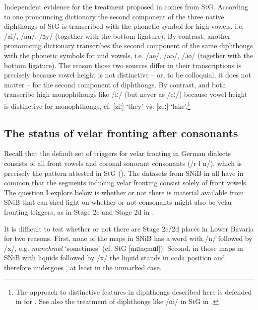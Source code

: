 Independent evidence for the treatment proposed in  comes from StG. According to one pronouncing dictionary \citep{Mangold2005} the second component of the three native diphthongs of StG is transcribed with the phonetic symbol for high vowels, i.e. /ai/, /au/, /ɔy/ (together with the bottom ligature). By contrast, another pronouncing dictionary \citep{Krech1982} transcribes the second component of the same diphthongs with the phonetic symbols for mid vowels, i.e. /ae/, /ao/, /ɔø/ (together with the bottom ligature). The reason those two sources differ in their transcriptions is precisely because vowel height is not distinctive -- or, to be colloquial, it does not matter -- for the second component of diphthongs. By contrast, \citet{Mangold2005} and \citet{Krech1982} both transcribe high monophthongs like /iː/ (but never as /eː/) because vowel height is distinctive for monophthongs, cf. [ziː] ‘they’ vs. [zeː] ‘lake’.\footnote{{The approach to distinctive features in diphthongs described here is defended in \citet{Noelliste2017} for . See also the treatment of diphthongs like /ɑi/ in StG in .}}

\subsection{The status of velar fronting after consonants}\label{sec:13.5.2}

Recall that the default set of triggers for velar fronting in German dialects consists of all front vowels and coronal sonorant consonants (/r l n/), which is precisely the pattern attested in StG (). The datasets from SNiB in  all have in common that the segments inducing velar fronting consist solely of front vowels. The question I explore below is whether or not there is material available from SNiB that can shed light on whether or not consonants might also be velar fronting triggers, as in Stage 2c and Stage 2d in .

It is difficult to test whether or not there are Stage 2c/2d places in Lower Bavaria for two reasons. First, none of the maps in SNiB has a word with /n/ followed by /x/, e.g. \textit{manchmal} ‘sometimes’ (cf. StG [mɑnçmɑl]). Second, in those maps in SNiB with liquids followed by /x/ the liquid stands in coda position and therefore undergoes , at least in the unmarked case.


